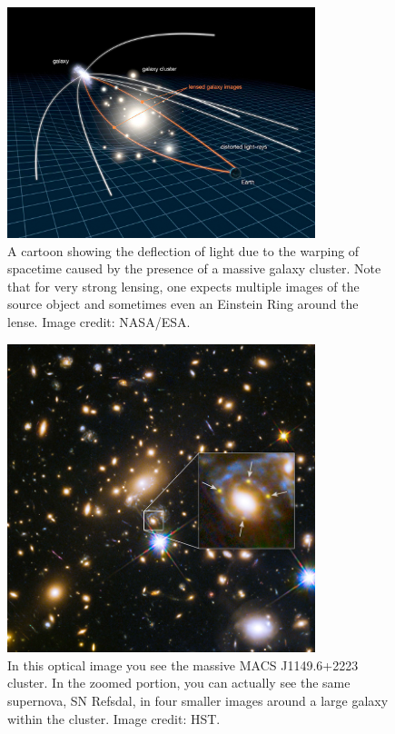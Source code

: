 \begin{figure}[t]
	\centering
	\includegraphics[width=0.8\textwidth]{gravitation_lensing_cartoon}
	\caption{A cartoon showing the deflection of light due to the warping of spacetime caused by the presence of a massive galaxy cluster.  Note that for very strong lensing, one expects multiple images of the source object and sometimes even an Einstein Ring around the lense. Image credit: NASA/ESA.}
	\label{fig:gravitation_lensing_cartoon}
\end{figure}

\begin{figure}[t]
	\centering
	\includegraphics[width=0.8\textwidth]{einstein_cross}
	\caption{In this optical image you see the massive MACS J1149.6+2223 cluster.  In the zoomed portion, you can actually see the same supernova, SN Refsdal, in four smaller images around a large galaxy within the cluster. Image credit: HST.}
	\label{fig:einstein_cross}
\end{figure}


